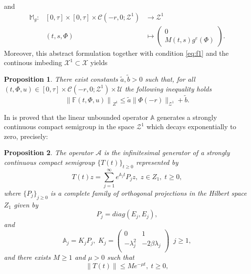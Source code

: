 \documentclass[11 pt]{amsart}
\newtheorem{prop}{\sc Proposition}[section]
\begin{document}
and
\begin{eqnarray*}
{\mathbb{M}_g}:&[0,\tau]\times [0,\tau]\times {\mathcal{C}}(-r,0;  {\mathcal{Z}}^{1} )  &\longrightarrow  {\mathcal{Z}}^{1} \\
&(t,s,\Phi)&\longmapsto \left(
  \begin{array}{c}
    0 \\M(t,s) g^{e}(\Phi)
  \end{array}
  \right).
\end{eqnarray*}
Moreover, this abstract formulation together with condition \eqref{eq:f1} and the continous imbeding ${\mathcal{X}}^1 \subset {\mathcal{X}}$ yields
\begin{prop}\label{prop:cotaF}
There exist constants  $\tilde{a},\tilde{b}>0$ such that, for all $(t, \Phi,u) \in [0, \tau] \times {\mathcal{C}}(-r,0;  {\mathcal{Z}}^{1} ) \times {\mathcal{U}}$ the following inequality holds
\begin{equation}\label{eq:bound}
{\left\| {{\mathbb{F}}(t,\Phi,u)}\right\|}_{Z^{1}}  \leq   \tilde{a}\| \Phi(-r) \|_{{\mathcal{Z}}^1}+\tilde{b}.
\end{equation}
\end{prop}
In \cite{Carrasco-Leiva:2013aa} is proved that the linear unbounded operator
${\mathbb{A}}$  generates a strongly continuous compact semigroup
 in the space ${\mathcal{Z}}^1$ which decays exponentially to zero, precisely:
\begin{prop}\label{semigroup}
The operator $\mathcal{A}$ is the infinitesimal generator
of a strongly continuous compact semigroup $\{T(t)\}_{t\geq0}$
represented by
\begin{equation}\label{repre}
T(t)z=\displaystyle\sum_{j=1}^{\infty}e^{\mathbb{A}_{j}t}P_{j}z,\;z\in
Z_{1},\;t\geq 0,
\end{equation}
where $\{P_{j}\}_{j\geq0}$ is a complete family of orthogonal
projections in the Hilbert space $Z_{1}$ given by
\begin{equation}\label{proyecciones}
    P_{j} = diag(E_{j},E_{j}),
\end{equation}
and
$$
\mathbb{A}_{j}=K_{j}P_{j},\;
K_{j}=\left(
                           \begin{array}{cc}
                             0 & 1 \\
                             -\lambda_{j}^{2}  & -2\beta\lambda_{j} \\
                           \end{array}
                         \right)\;\;j\geq 1,
$$
and there exists $M \geq 1$ and $\mu >0$ such that
$$
\parallel T(t)\parallel\leq Me^{-\mu t},\;t\geq0,
$$

\end{prop}
\end{document}
